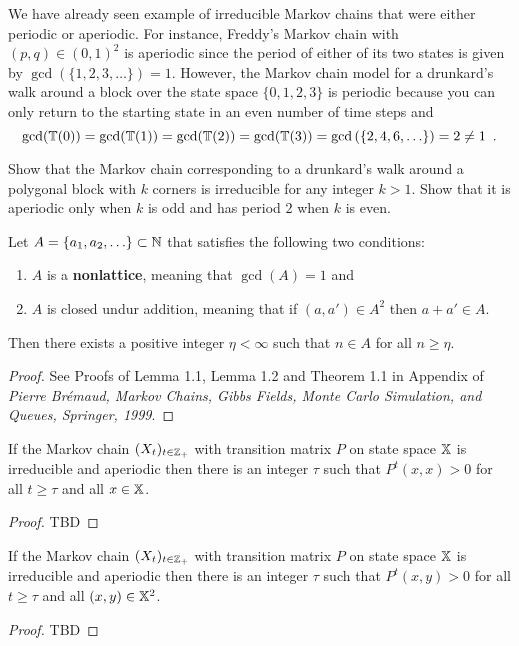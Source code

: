 {We have already seen example of irreducible Markov chains that  were either periodic or aperiodic.  For instance, Freddy's Markov chain with $(p,q) \in (0,1)^2$ is aperiodic since the period of either of its two states is given by $\gcd(\{1,2,3,\ldots\})=1$.  However, the Markov chain model for a drunkard's walk around a block over the state space $\{0,1,2,3\}$ %
is periodic because you can only return to the starting state in an even number of time steps and 
$$
\gcd(\mathbb{T}(0))=\gcd(\mathbb{T}(1))=\gcd(\mathbb{T}(2))=\gcd(\mathbb{T}(3))= \gcd \left( \{2,4,6,\ldots\} \right) =2 \neq 1 \enspace .
$$

\begin{exercise}\label{EXR:DrunkardsWalkOnKGonIrredAperiod}
Show that the Markov chain corresponding to a drunkard's walk around a polygonal block with $k$ corners is irreducible for any integer $k>1$.  Show that it is aperiodic only when $k$ is odd and has period $2$ when $k$ is even.
\end{exercise}

\begin{prop}\label{P:AdditionNonlattice} Let $A=\{a_1,a_2,\ldots\} \subset \mathbb{N}$ that satisfies the following two conditions:
\begin{enumerate}
\item $A$ is a {\bf nonlattice}, meaning that $\gcd(A)=1$ and
\item $A$ is closed undur addition, meaning that if $(a,a') \in A^2$ then $a+a' \in A$.
\end{enumerate}
Then there exists a positive integer $\eta < \infty$ such that $n \in A$ for all $n \geq \eta$.
\begin{proof}
See Proofs of Lemma 1.1, Lemma 1.2 and Theorem 1.1 in Appendix of {\em Pierre Br\'emaud, Markov Chains, Gibbs Fields, Monte Carlo Simulation, and Queues, Springer, 1999}.
\end{proof}
\end{prop}

\begin{prop}
If the Markov chain $(X_t)_{t\in\mathbb{Z}_+}$ with transition matrix $P$ on state space $\mathbb{X}$ is irreducible and aperiodic then there is an integer $\tau$ such that $P^t(x,x)>0$ for all $t \geq \tau$ and all $x \in \mathbb{X}$.
\begin{proof}
TBD
\end{proof}
\end{prop}

\begin{prop}
If the Markov chain $(X_t)_{t\in\mathbb{Z}_+}$ with transition matrix $P$ on state space $\mathbb{X}$ is irreducible and aperiodic then there is an integer $\tau$ such that $P^t(x,y)>0$ for all $t \geq \tau$ and all $(x,y) \in \mathbb{X}^2$.
\begin{proof}
TBD
\end{proof}
\end{prop}

}

